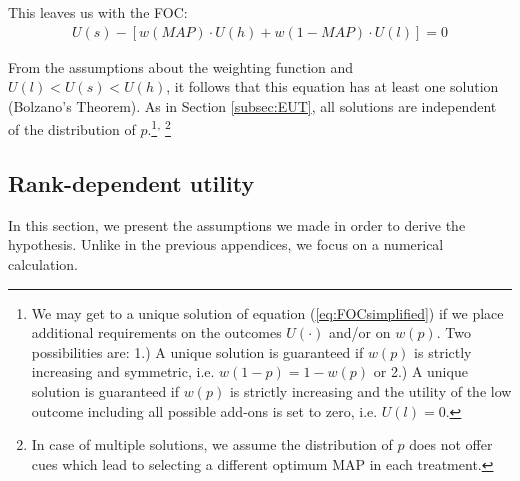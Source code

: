 This leaves us with the FOC:
\begin{align}
	\label{eq:FOCsimplified}
	U(s) - \left[w(\textit{MAP}) \cdot U(h) + w(1-\textit{MAP}) \cdot U(l) \right] = 0 
\end{align}

From the assumptions about the weighting function and $U(l)<U(s)<U(h)$, it follows that this equation has at least one solution (Bolzano's Theorem).
As in Section \ref{subsec:EUT}, all solutions are independent of the distribution of $p$.\footnote{
We may get to a unique solution of equation (\ref{eq:FOCsimplified}) if we place additional requirements on the outcomes $U(\cdot)$ and/or on $w(p)$.
Two possibilities are:
1.) A unique solution is guaranteed if $w(p)$ is strictly increasing and symmetric, i.e. $w(1-p) = 1-w(p)$ or
2.) A unique solution is guaranteed if $w(p)$ is strictly increasing and the utility of the low outcome including all possible add-ons is set to zero, i.e. $U(l) = 0$.
}\textsuperscript{,} 
\footnote{
In case of multiple solutions, we assume the distribution of $p$ does not offer cues which lead to selecting a different optimum MAP in each treatment.
}
	

\subsection{Rank-dependent utility}
\label{subsec:RDU}
In this section, we present the assumptions we made in order to derive the hypothesis.
Unlike in the previous appendices, we focus on a numerical calculation.

